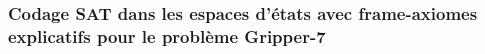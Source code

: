 

\subsubsection{Codage SAT dans les espaces d'états avec frame-axiomes explicatifs pour le problème Gripper-7}

